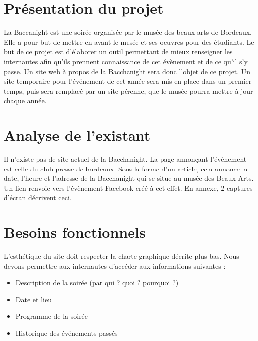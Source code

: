 \documentclass[12pt]{article}
\begin{document}
\section{Présentation du projet}

La Baccanight est une soirée organisée par le musée des beaux arts de Bordeaux. Elle a pour but de mettre en avant le musée et ses oeuvres pour des étudiants. Le but de ce projet est d’élaborer un outil permettant de mieux renseigner les internautes afin qu’ils prennent connaissance de cet évènement et de ce qu’il s’y passe. Un site web à propos de la Bacchanight sera donc l’objet de ce projet. Un site temporaire pour l'événement de cet année sera mis en place dans un premier temps, puis sera remplacé par un site pérenne, que le musée pourra mettre à jour chaque année.


\section{Analyse de l'existant}

Il n’existe pas de site actuel de la Bacchanight. La page annonçant l’évènement est celle du club-presse de bordeaux. Sous la forme d’un article, cela annonce la date, l’heure et l’adresse de la Bacchanight qui se situe au musée des Beaux-Arts. Un lien renvoie vers l’évènement Facebook créé à cet effet. En annexe, 2 captures d’écran décrivent ceci.


\section{Besoins fonctionnels}

L’esthétique du site doit respecter la charte graphique décrite plus bas. Nous devons permettre aux internautes d’accéder aux informations suivantes :
\begin{itemize}
  \item Description de la soirée (par qui ? quoi ? pourquoi ?)
  \item Date et lieu
  \item Programme de la soirée
  \item Historique des événements passés
\end{itemize}
\end{document}
